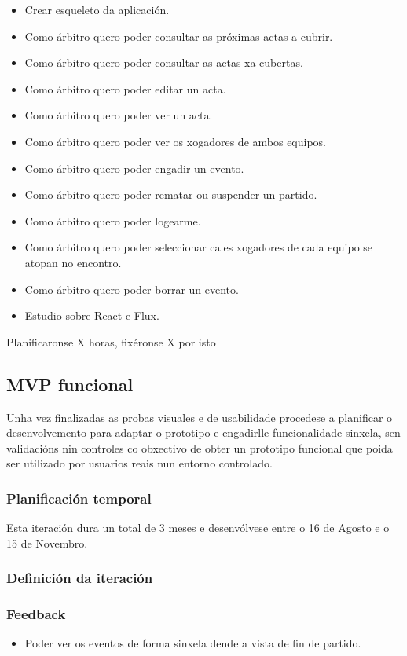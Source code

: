       \begin{itemize}
        \item Crear esqueleto da aplicación.
        \item Como árbitro quero poder consultar as próximas actas a 
cubrir.
        \item Como árbitro quero poder consultar as actas xa cubertas.
        \item Como árbitro quero poder editar un acta.
        \item Como árbitro quero poder ver un acta.
        \item Como árbitro quero poder ver os xogadores de ambos equipos.
        \item Como árbitro quero poder engadir un evento.
        \item Como árbitro quero poder rematar ou suspender un partido.
        \item Como árbitro quero poder logearme.
        \item Como árbitro quero poder seleccionar cales xogadores de cada 
equipo se atopan no encontro.
        \item Como árbitro quero poder borrar un evento.
        \item Estudio sobre React e Flux.
       \end{itemize}

      Planificaronse X horas, fixéronse X por isto

    \subsection{MVP funcional}
    Unha vez finalizadas as probas visuales e de usabilidade procedese 
a planificar o desenvolvemento para adaptar o prototipo e engadirlle 
funcionalidade sinxela, sen validacións nin controles co obxectivo de obter un 
prototipo funcional que poida ser utilizado por usuarios reais nun entorno 
controlado.

      \subsubsection{Planificación temporal}
      Esta iteración dura un total de 3 meses e desenvólvese entre o 16 de 
Agosto e o 15 de Novembro.

      \subsubsection{Definición da iteración}
      \subsubsection{Feedback}
      \begin{itemize}
      \item Poder ver os eventos de forma sinxela dende a vista de fin
        de partido.
      \end{itemize}
